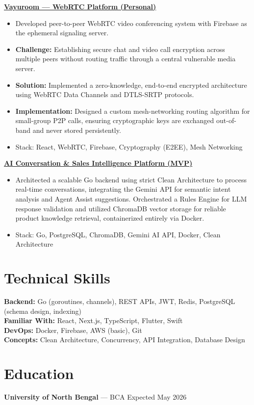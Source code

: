 \documentclass[10pt, letterpaper]{article}
\newenvironment{tightitem}{
    \begin{itemize}[topsep=0pt, itemsep=0pt, parsep=0.3pt, leftmargin=10pt]
}{
    \end{itemize}
}
\begin{document}
\href{https://vayuroom.vercel.app/}{\textbf{Vayuroom — WebRTC Platform (Personal)}}  
\begin{tightitem}
\item Developed peer-to-peer WebRTC video conferencing system with Firebase as the ephemeral signaling server.
\item \textbf{Challenge:} Establishing secure chat and video call encryption across multiple peers without routing traffic through a central vulnerable media server.
\item \textbf{Solution:} Implemented a zero-knowledge, end-to-end encrypted architecture using WebRTC Data Channels and DTLS-SRTP protocols.
\item \textbf{Implementation:} Designed a custom mesh-networking routing algorithm for small-group P2P calls, ensuring cryptographic keys are exchanged out-of-band and never stored persistently.
\item Stack: React, WebRTC, Firebase, Cryptography (E2EE), Mesh Networking
\end{tightitem}


\href{https://github.com/RoyRoki/AI_Conversation_Sales_Intelligence_Platform_MVP}{\textbf{AI Conversation \& Sales Intelligence Platform (MVP)}}  
\begin{tightitem}
\item Architected a scalable Go backend using strict Clean Architecture to process real-time conversations, integrating the Gemini API for semantic intent analysis and Agent Assist suggestions. Orchestrated a Rules Engine for LLM response validation and utilized ChromaDB vector storage for reliable product knowledge retrieval, containerized entirely via Docker.
\item Stack: Go, PostgreSQL, ChromaDB, Gemini AI API, Docker, Clean Architecture
\end{tightitem}


\section{Technical Skills}

\textbf{Backend:} Go (goroutines, channels), REST APIs, JWT, Redis, PostgreSQL (schema design, indexing) \\
\textbf{Familiar With:} React, Next.js, TypeScript, Flutter, Swift \\
\textbf{DevOps:} Docker, Firebase, AWS (basic), Git \\
\textbf{Concepts:} Clean Architecture, Concurrency, API Integration, Database Design

\section{Education}

\textbf{University of North Bengal} — BCA \hfill Expected May 2026
\end{document}
